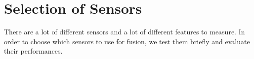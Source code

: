 \section{Selection of Sensors}
There are a lot of different sensors and a lot of different features to measure.
In order to choose which sensors to use for fusion, we test them briefly and evaluate their performances.



